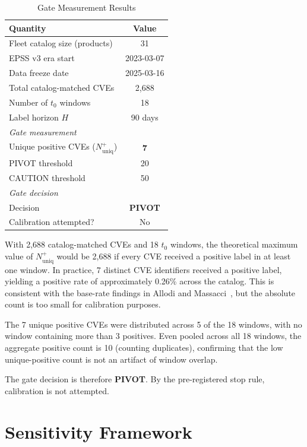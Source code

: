 \documentclass[conference]{IEEEtran}
\begin{document}
\begin{table}[t]
\caption{Gate Measurement Results}
\label{tab:gate-results}
\centering
\begin{tabular}{@{}lc@{}}
\toprule
\textbf{Quantity} & \textbf{Value} \\
\midrule
Fleet catalog size (products) & 31 \\
EPSS v3 era start & 2023-03-07 \\
Data freeze date & 2025-03-16 \\
Total catalog-matched CVEs & 2,688 \\
Number of $t_0$ windows & 18 \\
Label horizon $H$ & 90 days \\
\midrule
\textit{Gate measurement} & \\
Unique positive CVEs ($N^+_{\text{uniq}}$) & \textbf{7} \\
PIVOT threshold & 20 \\
CAUTION threshold & 50 \\
\midrule
\textit{Gate decision} & \\
Decision & \textbf{PIVOT}\\
Calibration attempted? & No \\
\bottomrule
\end{tabular}
\end{table}

With 2,688 catalog-matched CVEs and 18 $t_0$ windows, the theoretical
maximum value of $N^+_{\text{uniq}}$ would be 2,688 if every CVE received
a positive label in at least one window. In practice, 7 distinct CVE
identifiers received a positive label, yielding a positive rate of
approximately 0.26\% across the catalog. This is consistent with
the base-rate findings in Allodi and Massacci~\cite{allodi2014comparing},
but the absolute count is too small for calibration purposes.

The 7 unique positive CVEs were distributed across 5 of the 18 windows,
with no window containing more than 3 positives. Even pooled across all
18 windows, the aggregate positive count is 10 (counting duplicates),
confirming that the low unique-positive count is not an artifact of
window overlap.

The gate decision is therefore \textbf{PIVOT}. By the pre-registered
stop rule, calibration is not attempted.

\section{Sensitivity Framework}
\label{sec:sensitivity}
\end{document}
